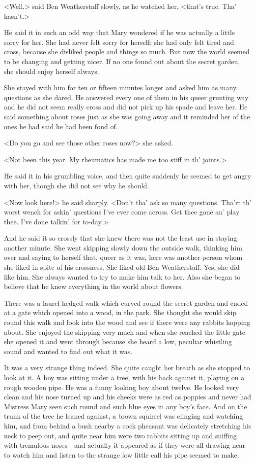 <Well,> said Ben Weatherstaff slowly, as he watched her, <that's true. Tha' hasn't.>

He said it in such an odd way that Mary wondered if he was actually a little sorry for her. She had never felt sorry for herself; she had only felt tired and cross, because she disliked people and things so much. But now the world seemed to be changing and getting nicer. If no one found out about the secret garden, she should enjoy herself always.

She stayed with him for ten or fifteen minutes longer and asked him as many questions as she dared. He answered every one of them in his queer grunting way and he did not seem really cross and did not pick up his spade and leave her. He said something about roses just as she was going away and it reminded her of the ones he had said he had been fond of.

<Do you go and see those other roses now?> she asked.

<Not been this year. My rheumatics has made me too stiff in th' joints.>

He said it in his grumbling voice, and then quite suddenly he seemed to get angry with her, though she did not see why he should.

<Now look here!> he said sharply. <Don't tha' ask so many questions. Tha'rt th' worst wench for askin' questions I've ever come across. Get thee gone an' play thee. I've done talkin' for to-day.>

And he said it so crossly that she knew there was not the least use in staying another minute. She went skipping slowly down the outside walk, thinking him over and saying to herself that, queer as it was, here was another person whom she liked in spite of his crossness. She liked old Ben Weatherstaff. Yes, she did like him. She always wanted to try to make him talk to her. Also she began to believe that he knew everything in the world about flowers.

There was a laurel-hedged walk which curved round the secret garden and ended at a gate which opened into a wood, in the park. She thought she would skip round this walk and look into the wood and see if there were any rabbits hopping about. She enjoyed the skipping very much and when she reached the little gate she opened it and went through because she heard a low, peculiar whistling sound and wanted to find out what it was.

It was a very strange thing indeed. She quite caught her breath as she stopped to look at it. A boy was sitting under a tree, with his back against it, playing on a rough wooden pipe. He was a funny looking boy about twelve. He looked very clean and his nose turned up and his cheeks were as red as poppies and never had Mistress Mary seen such round and such blue eyes in any boy's face. And on the trunk of the tree he leaned against, a brown squirrel was clinging and watching him, and from behind a bush nearby a cock pheasant was delicately stretching his neck to peep out, and quite near him were two rabbits sitting up and sniffing with tremulous noses—and actually it appeared as if they were all drawing near to watch him and listen to the strange low little call his pipe seemed to make.

